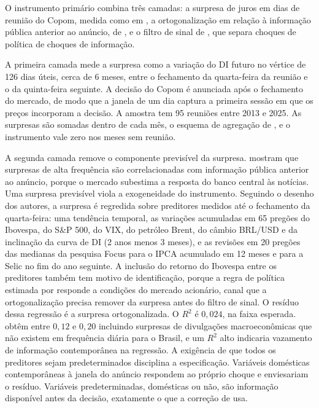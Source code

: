 \documentclass[preprint,authoryear,review,12pt]{elsarticle}
\begin{document}
O instrumento primário combina três camadas: a surpresa de juros em dias de reunião do Copom, medida como em \cite{gertler2015}, a ortogonalização em relação à informação pública anterior ao anúncio, de \cite{bauer2023}, e o filtro de sinal de \cite{jarocinski2020}, que separa choques de política de choques de informação.

A primeira camada mede a surpresa como a variação do DI futuro no vértice de 126 dias úteis, cerca de 6 meses, entre o fechamento da quarta-feira da reunião e o da quinta-feira seguinte. A decisão do Copom é anunciada após o fechamento do mercado, de modo que a janela de um dia captura a primeira sessão em que os preços incorporam a decisão. A amostra tem 95 reuniões entre 2013 e 2025. As surpresas são somadas dentro de cada mês, o esquema de agregação de \cite{jarocinski2020}, e o instrumento vale zero nos meses sem reunião.

A segunda camada remove o componente previsível da surpresa. \cite{bauer2023} mostram que surpresas de alta frequência são correlacionadas com informação pública anterior ao anúncio, porque o mercado subestima a resposta do banco central às notícias. Uma surpresa previsível viola a exogeneidade do instrumento. Seguindo o desenho dos autores, a surpresa é regredida sobre preditores medidos até o fechamento da quarta-feira: uma tendência temporal, as variações acumuladas em 65 pregões do Ibovespa, do S\&P 500, do VIX, do petróleo Brent, do câmbio BRL/USD e da inclinação da curva de DI (2 anos menos 3 meses), e as revisões em 20 pregões das medianas da pesquisa Focus para o IPCA acumulado em 12 meses e para a Selic no fim do ano seguinte. A inclusão do retorno do Ibovespa entre os preditores também tem motivo de identificação, porque a regra de política estimada por \cite{castelnuovo} responde a condições do mercado acionário, canal que a ortogonalização precisa remover da surpresa antes do filtro de sinal. O resíduo dessa regressão é a surpresa ortogonalizada. O $R^2$ é $0{,}024$, na faixa esperada. \cite{bauer2023} obtêm entre $0{,}12$ e $0{,}20$ incluindo surpresas de divulgações macroeconômicas que não existem em frequência diária para o Brasil, e um $R^2$ alto indicaria vazamento de informação contemporânea na regressão. A exigência de que todos os preditores sejam predeterminados disciplina a especificação. Variáveis domésticas contemporâneas à janela do anúncio respondem ao próprio choque e enviesariam o resíduo. Variáveis predeterminadas, domésticas ou não, são informação disponível antes da decisão, exatamente o que a correção de \cite{bauer2023} usa.
\end{document}
